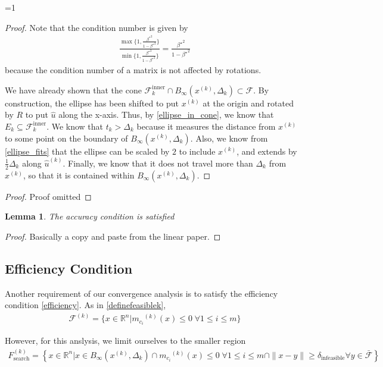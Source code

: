 \documentclass{article}
\newtheorem{lemma}[theorem]{Lemma}
\theoremstyle{case}
\newcommand{\xk}{{x^{(k)}}}
\newcommand{\Rn}{\mathbb R^n}
\newcommand{\dk}{\Delta_k}
\newcommand{\mcik}{{{m}_{c_i}}^{(k)}}
\newcommand{\feasible}{{\mathcal F}}
\newcommand{\feasiblek}{{\mathcal F^{(k)}}}
\newcommand{\huk}{{{\hat u}^{(k)}}}
\newcommand{\bs}{{\beta^{\star}}}
\newcommand{\fcki}{{\mathcal {F}^{\text{inner}}_k}}
\newcommand{\trstol}{{\delta_\text{infeasible}}}
\newcommand{\trsfesset}{{F^{(k)}_\text{search}}}
\newcommand{\tr}{{ B_{\infty}\left(\xk, \dk\right) }}
\def\includeproofs{1}
\begin{document}
\ifnum\includeproofs=1
\begin{proof}
Note that the condition number is given by
\begin{align*}
\frac{\max\{1, \frac{\bs^2}{1 - \bs^2}\}}{\min\{1, \frac{\bs^2}{1 - \bs^2}\}} = \frac{\bs^2}{1 - \bs^2}
\end{align*}
because the condition number of a matrix is not affected by rotations.

We have already shown that the cone $\fcki \cap \tr \subset \feasible$.
By construction, the ellipse has been shifted to put $\xk$ at the origin and rotated by $R$ to put $\hat u$ along the x-axis.
Thus, by \cref{ellipse_in_cone}, we know that $E_k \subseteq \fcki$.
We know that $t_k > \dk$ because it measures the distance from $\xk$ to some point on the boundary of $\tr$.
Also, we know from \cref{ellipse_fits} that the ellipse can be scaled by $2$ to include $\xk$, and extends by $\frac 1 2 \dk$ along $\huk$.
Finally, we know that it does not travel more than $\dk$ from $\xk$, so that it is contained within $\tr$.
\end{proof}
\else
\begin{proof}
Proof omitted
\end{proof}
\fi

\begin{lemma}
The accuracy condition is satisfied
\end{lemma}

\begin{proof}
Basically a copy and paste from the linear paper.
\end{proof}

\color{red}
\subsection{Efficiency Condition}
\label{efficiency_condition_analysis}

Another requirement of our convergence analysis is to satisfy the efficiency condition \cref{efficiency}.
As in \cref{definefeasiblek},
\begin{align*}
\feasiblek = \{x \in \Rn | \mcik(x) \le 0 \; \forall 1 \le i \le m \}
\end{align*}

However, for this anslysis, we limit ourselves to the smaller region
\begin{align}
\trsfesset = \left\{x \in \Rn | x \in \tr \cap \mcik(x) \le 0 \; \forall 1 \le i \le m\cap \|x - y \| \ge \trstol \forall y \in \bar \feasible\right\}
\end{align}
\end{document}
